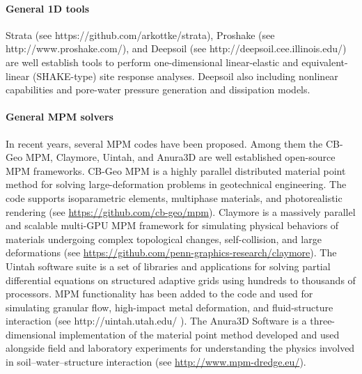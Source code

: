 \paragraph{General 1D tools}
Strata (see https://github.com/arkottke/strata), Proshake (see http://www.proshake.com/), and Deepsoil (see http://deepsoil.cee.illinois.edu/) are well establish tools to perform one-dimensional linear-elastic and equivalent-linear (SHAKE-type) site response analyses. Deepsoil also including nonlinear capabilities and pore-water pressure generation and dissipation models.

\paragraph{General MPM solvers}
In recent years, several MPM codes have been proposed. Among them the CB-Geo MPM, Claymore, Uintah, and Anura3D are well established open-source MPM frameworks. CB-Geo MPM is a highly parallel distributed material point method for solving large-deformation problems in geotechnical engineering. The code supports isoparametric elements, multiphase materials, and photorealistic rendering (see 
\url{https://github.com/cb-geo/mpm}). Claymore is a massively parallel and scalable multi-GPU MPM framework for simulating physical behaviors of materials undergoing complex topological changes, self-collision, and large deformations (see \url{https://github.com/penn-graphics-research/claymore}). The Uintah software suite is a set of libraries and applications for solving partial differential equations on structured adaptive grids using hundreds to thousands of processors. MPM functionality has been added to the code and used for simulating granular flow, high-impact metal deformation, and fluid-structure interaction (see http://uintah.utah.edu/ ). The Anura3D Software is a three-dimensional implementation of the material point method developed and used alongside field and laboratory experiments for understanding the physics involved in soil--water--structure interaction (see \url{http://www.mpm-dredge.eu/}).

